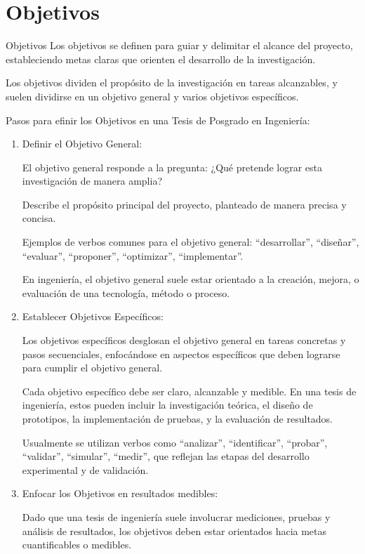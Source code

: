 \documentclass[9pt]{beamer}
\begin{document}
\section{Objetivos}
\begin{frame}{Objetivos}
Los objetivos se definen para guiar y delimitar el alcance del proyecto, estableciendo metas claras que orienten el desarrollo de la investigación. 

Los objetivos dividen el propósito de la investigación en tareas alcanzables, y suelen dividirse en un objetivo general y varios objetivos específicos.

Pasos para  efinir los Objetivos en una Tesis de Posgrado en Ingeniería:

\begin{enumerate}
    \item Definir el Objetivo General:

    El objetivo general responde a la pregunta: ¿Qué pretende lograr esta investigación de manera amplia?

    Describe el propósito principal del proyecto, planteado de manera precisa y concisa.

    Ejemplos de verbos comunes para el objetivo general: ``desarrollar'', ``diseñar'', ``evaluar'', ``proponer'', ``optimizar'', ``implementar''.

    En ingeniería, el objetivo general suele estar orientado a la creación, mejora, o evaluación de una tecnología, método o proceso.

    \item Establecer Objetivos Específicos:

    Los objetivos específicos desglosan el objetivo general en tareas concretas y pasos secuenciales, enfocándose en aspectos específicos que deben lograrse para cumplir el objetivo general.

    Cada objetivo específico debe ser claro, alcanzable y medible. En una tesis de ingeniería, estos pueden incluir la investigación teórica, el diseño de prototipos, la implementación de pruebas, y la evaluación de resultados.

    Usualmente se utilizan verbos como ``analizar'', ``identificar'', ``probar'', ``validar'', ``simular'', ``medir'', que reflejan las etapas del desarrollo experimental y de validación.

    \item Enfocar los Objetivos en resultados medibles:

    Dado que una tesis de ingeniería suele involucrar mediciones, pruebas y análisis de resultados, los objetivos deben estar orientados hacia metas cuantificables o medibles.


\end{enumerate}
\end{frame}
\end{document}
